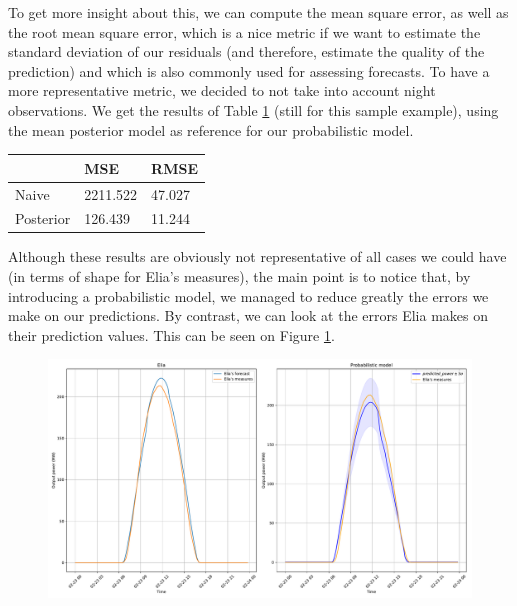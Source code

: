 \documentclass[a4paper, 12pt]{article}
\begin{document}
	To get more insight about this, we can compute the mean square error, as well as the root mean square error, which is a nice metric if we want to estimate the standard deviation of our residuals (and therefore, estimate the quality of the prediction) and which is also commonly used for assessing forecasts\cite{bocquet}. To have a more representative metric, we decided to not take into account night observations. We get the results of Table \ref{tab:naive_post} (still for this sample example), using the mean posterior model as reference for our probabilistic model.
	
	\begin{table}[H]
    	\centering
        \begin{tabular}{l|l|l}
                  & MSE      & RMSE   \\ \hline
        Naive     & 2211.522 & 47.027 \\ \hline
        Posterior & 126.439  & 11.244
        \end{tabular}
        \label{tab:naive_post}
    \end{table}
	
	Although these results are obviously not representative of all cases we could have (in terms of shape for Elia's measures), the main point is to notice that, by introducing a probabilistic model, we managed to reduce greatly the errors we make on our predictions. By contrast, we can look at the errors Elia makes on their prediction values. This can be seen on Figure \ref{fig:comparison_elia_post}.
	
	\begin{figure}[H]
	    \centering
	    \includegraphics[width=\textwidth]{resources/pdf/comparison_elia_post.pdf}
	    \label{fig:comparison_elia_post}
	\end{figure}
\end{document}
